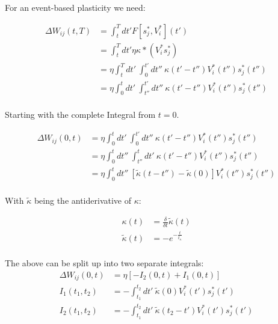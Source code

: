 For an event-based plasticity we need:

\begin{align}
  \Delta W_{ij}(t,T) & = \int_t^T dt' F[s_j^\ast , V_i^\ast ](t')                                                 \\
                     & = \int_t^T dt' \eta \kappa \ast (V_i^\ast s_j^\ast)                                        \\
                     & = \eta \int_t^T dt' \  \int_0^{t'} dt'' \ \kappa(t'-t'') V_i^\ast (t'') s_j^\ast (t'')     \\
                     & = \eta \int_0^t dt' \  \int_{t''}^{t'} dt'' \ \kappa(t'-t'') V_i^\ast (t'') s_j^\ast (t'') \\
\end{align}


Starting with the complete Integral from $t=0$.

\begin{align}
  \Delta W_{ij}(0,t) & =\eta \int_0^t dt' \  \int_0^{t'} dt'' \ \kappa(t'-t'') V_i^\ast (t'') s_j^\ast (t'')                          \\
                     & = \eta \int_0^t dt'' \  \int_{t''}^{t} dt' \ \kappa(t'-t'') V_i^\ast (t'') s_j^\ast (t'')                      \\
                     & = \eta \int_0^t dt'' \  \left[ \tilde{\kappa}(t-t'') - \tilde{\kappa}(0) \right] V_i^\ast (t'') s_j^\ast (t'') \\
\end{align}

With $\tilde{\kappa}$ being the antiderivative of $\kappa$:

\begin{align}
  \kappa(t)         & = \frac{\delta}{\delta t} \tilde{\kappa}(t) \\
  \tilde{\kappa}(t) & = - e^{-\frac{t}{t_{\kappa}}}               \\
\end{align}

The above can be split up into two separate integrals:
\begin{align}
  \Delta W_{ij}(0,t) & =\eta \left[ -I_2 (0, t) + I_1(0,t) \right]                                      \\
  I_1(t_1, t_2)      & = - \int_{t_1}^{t_2} dt' \ \tilde{\kappa} (0) V_i^\ast (t') s_j^\ast (t')        \\
  I_2(t_1, t_2)      & = - \int_{t_1}^{t_2} dt' \ \tilde{\kappa} (t_2 - t') V_i^\ast (t') s_j^\ast (t') \\
\end{align}

